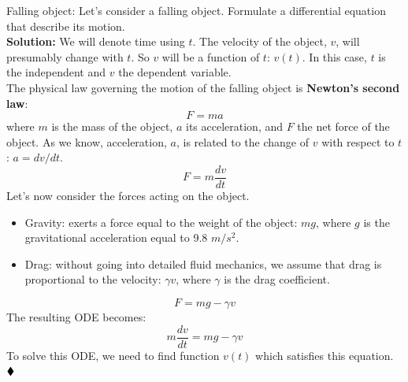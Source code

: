 \begin{exmp}{Falling object:}{}
Let's consider a falling object. Formulate a differential equation that describe its motion.\\
\textbf{Solution:}
We will denote time using $t$. The velocity of the object, $v$, will presumably change with $t$. So $v$ will be a function of $t$: $v(t)$. In this case, $t$ is the independent and $v$ the dependent variable.\\
The physical law governing the motion of the falling object is \textbf{Newton's second law}:
\begin{equation}
F=ma
\end{equation}
where $m$ is the mass of the object, $a$ its acceleration, and $F$ the net force of the object. As we know, acceleration, $a$, is related to the change of $v$ with respect to $t$: $a=dv/dt$.\\
\begin{equation}
F=m\frac{dv}{dt}
\end{equation}
Let's now consider the forces acting on the object. 
\begin{itemize}
\item Gravity: exerts a force equal to the weight of the object: $mg$, where $g$ is the gravitational acceleration equal to 9.8 $m/s^2$.
\item Drag: without going into detailed fluid mechanics, we assume that drag is proportional to the velocity: $\gamma v$, where $\gamma$ is the drag coefficient.
\end{itemize}
\begin{equation}
F=mg-\gamma v
\end{equation}
The resulting ODE becomes:
\begin{equation}
m\frac{dv}{dt}=mg-\gamma v
\end{equation}
To solve this ODE, we need to find function $v(t)$ which satisfies this equation. $\mathbin{\blacklozenge}$
\end{exmp}
\updateinfo[September 10, 2018]


